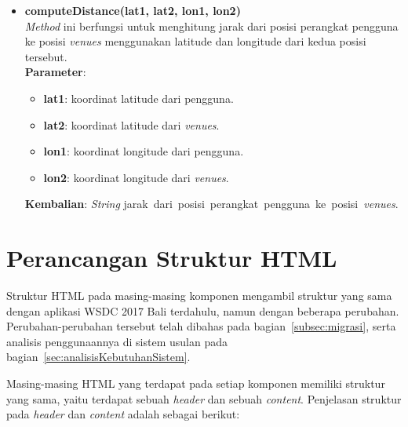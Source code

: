 \begin{enumerate}
\begin{itemize}
					\item \textbf{computeDistance(lat1, lat2, lon1, lon2)} \\
						\textit{Method} ini berfungsi untuk menghitung jarak dari posisi perangkat pengguna ke posisi \textit{venues} menggunakan latitude dan longitude dari kedua posisi tersebut.\\
						\textbf{Parameter}: 
						\begin{itemize}
							\item \textbf{lat1}: koordinat latitude dari pengguna.
							\item \textbf{lat2}: koordinat latitude dari \textit{venues}.
							\item \textbf{lon1}: koordinat longitude dari pengguna.
							\item \textbf{lon2}: koordinat longitude dari \textit{venues}.
						\end{itemize}
						\textbf{Kembalian}: \textit{String} jarak~dari~posisi~perangkat~pengguna~ke~posisi~\textit{venues}.
				\end{itemize}
\end{enumerate}

\section{Perancangan Struktur HTML}
\label{sec:perancanganStrukturHTML}

	Struktur HTML pada masing-masing komponen mengambil struktur yang sama dengan aplikasi WSDC 2017 Bali terdahulu, namun dengan beberapa perubahan. Perubahan-perubahan tersebut telah dibahas pada bagian~\ref{subsec:migrasi}, serta analisis penggunaannya di sistem usulan pada bagian~\ref{sec:analisisKebutuhanSistem}.
	
	Masing-masing HTML yang terdapat pada setiap komponen memiliki struktur yang sama, yaitu terdapat sebuah \textit{header} dan sebuah \textit{content}. Penjelasan struktur pada \textit{header} dan \textit{content} adalah sebagai berikut:
	
